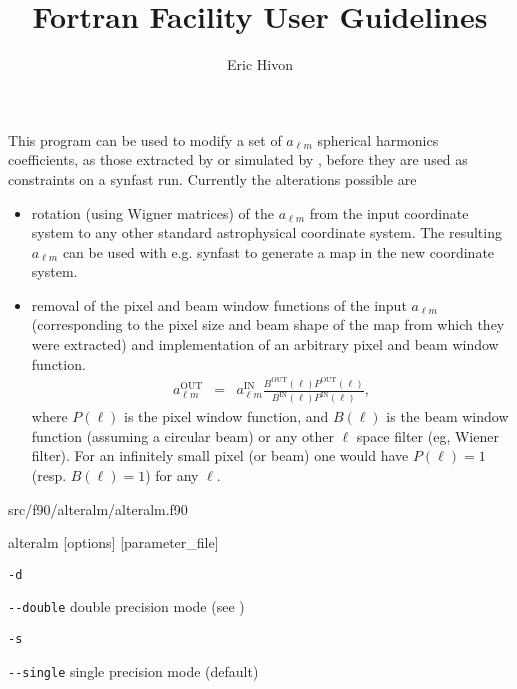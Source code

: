 
\sloppy


\title{\healpix Fortran Facility User Guidelines}
 \section[alteralm]{\nosectionname}
\label{fac:alteralm}
\author{Eric Hivon}

\begin{facility}
{This program can be used to modify a set of $a_{\ell m}$ spherical harmonics
  coefficients, as those extracted by  or 
  simulated by , before
  they are used as constraints on a synfast run. Currently the alterations
  possible are %
\begin{itemize}
    \item rotation (using Wigner matrices) of the $a_{\ell m}$ from the input
    coordinate system to any other standard astrophysical coordinate system. The
    resulting $a_{\ell m}$ can be used with e.g. synfast to generate a map in the
    new coordinate system.
    \item removal of the pixel and beam window functions of the input
  $a_{\ell m}$ (corresponding to the pixel size and beam shape of the map from which
  they were extracted) and implementation of an arbitrary pixel and beam window
  function.
 \begin{eqnarray} 
 a_{\ell m}^\mathrm{OUT} &=& a_{\ell m}^\mathrm{IN} 
 \frac{B^\mathrm{OUT}(\ell) P^\mathrm{OUT}(\ell)}{B^\mathrm{IN}(\ell) 
 P^\mathrm{IN}(\ell)}, \label{eq:alteralm} 
 \end{eqnarray}
where $P(\ell)$ is the pixel window function, and $B(\ell)$ is the beam window
 function (assuming a circular beam) or any other $\ell$ space filter (eg,
 Wiener filter). For an infinitely small pixel (or beam) one would have $P(\ell) =
 1$ (resp. $B(\ell) = 1$) for any $\ell$.
\end{itemize}%
}%
{src/f90/alteralm/alteralm.f90}
\end{facility}

\begin{f90facility}
{alteralm [options] [parameter\_file]}
\end{f90facility}

\begin{options}
  \begin{optionlistwide}{} %
    \item[{\tt -d}]
    \item[{\tt -}{\tt -}{\tt double}] double precision mode (see 
)
    \item[{\tt -s}]
    \item[{\tt -}{\tt -}{\tt single}] single precision mode (default)
  \end{optionlistwide}
\end{options}

